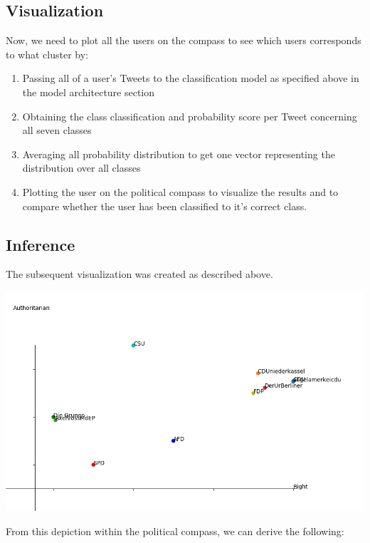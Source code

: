 \documentclass[10pt, oneside]{article}
\newenvironment{Figure}
	{\par\medskip\noindent\minipage{\linewidth}}
	{\endminipage\par\medskip}
\begin{document}
\begin{multicols}{2}
\subsection{Visualization}

Now, we need to plot all the users on the compass to see which users corresponds to what cluster by:
\begin{enumerate}
	\item Passing all of a user's Tweets to the classification model as specified above in the model architecture section
	\item Obtaining the class classification and probability score per Tweet concerning all seven classes
	\item Averaging all probability distribution to get one vector representing the distribution over all classes
	\item Plotting the user on the political compass to visualize the results and to compare whether the user has been classified to it’s correct class.
\end{enumerate}

\subsection{Inference}

The subsequent visualization was created as described above.

\begin{Figure}
	\centering
	\includegraphics[width=\linewidth]{images/Political_Compass.png}
\end{Figure}



From this depiction within the political compass, we can derive the following:


\end{multicols}
\end{document}
